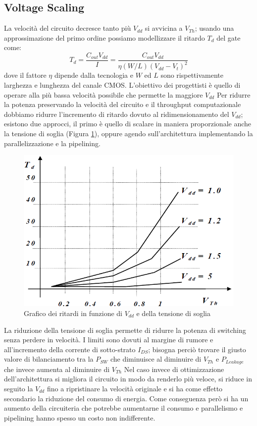 \subsection{Voltage Scaling}
La velocità del circuito decresce tanto più $V_{dd}$ si avvicina a $V_{Th}$; usando una approssimazione del primo ordine possiamo modellizzare il ritardo $T_d$ del gate come:
$$T_d = \frac{C_{out}V_{dd}}{I}=\frac{C_{out}V_{dd}}{\eta(W/L)(V_{dd}-V_t)^2}$$
dove il fattore $\eta$ dipende dalla tecnologia e $W$ ed $L$ sono rispettivamente larghezza e lunghezza del canale CMOS.
L'obiettivo dei progettisti è quello di operare alla più bassa velocità possibile che permette la maggiore $V_{dd}$
Per ridurre la potenza preservando la velocità del circuito e il throughput computazionale dobbiamo ridurre l'incremento di ritardo dovuto al ridimensionamento del $V_{dd}$; esistono due approcci, il primo è quello di scalare in maniera proporzionale anche la tensione di soglia (Figura \ref{fig:thvdd}), oppure agendo sull'architettura implementando la parallelizzazione e la pipelining.
\begin{figure}[hbt]
\centering
\includegraphics[scale=0.5]{img/thvdd.png}
\caption{Grafico dei ritardi in funzione di $V_{dd}$ e della tensione di soglia}\label{fig:thvdd}
\end{figure}
La riduzione della tensione di soglia permette di ridurre la potenza di switching senza perdere in velocità. I limiti sono dovuti al margine di rumore e all'incremento della corrente di sotto-strato $I_{DS}$; bisogna perciò trovare il giusto valore di bilanciamento tra la $P_{SW}$ che diminuisce al diminuire di $V_{Th}$ e $P_{Leakage}$ che invece aumenta al diminuire di $V_{Th}$
Nel caso invece di ottimizzazione dell'architettura si migliora il circuito in modo da renderlo più veloce, si riduce in seguito la $V_{dd}$ fino a ripristinare la velocità originale e si ha come effetto secondario la riduzione del consumo di energia. Come conseguenza però si ha un aumento della circuiteria che potrebbe aumentarne il consumo e parallelismo e pipelining hanno spesso un costo non indifferente.
